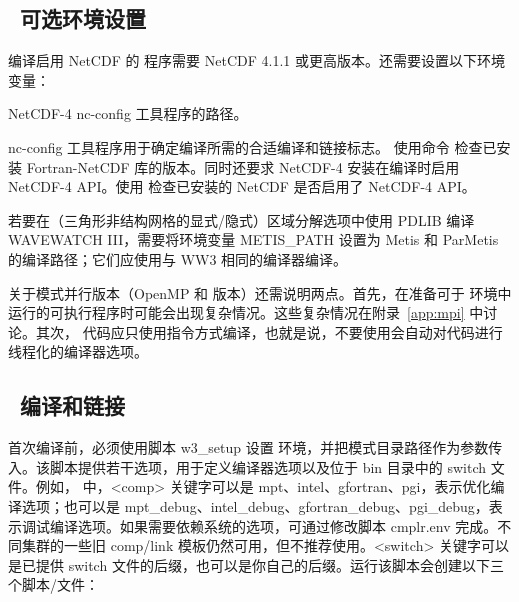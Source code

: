 \vssub
\subsection{~可选环境设置}
\vssub

编译启用 NetCDF 的 \ws{} 程序需要 NetCDF 4.1.1 或更高版本。还需要设置以下环境变量：
\begin{clist}
 {NetCDF-4 nc-config 工具程序的路径。}
\end{clist}
{\file nc-config} 工具程序用于确定编译所需的合适编译和链接标志。
使用命令
 检查已安装 Fortran-NetCDF 库的版本。同时还要求 NetCDF-4 安装在编译时启用 NetCDF-4 API。使用  检查已安装的 NetCDF 是否启用了 NetCDF-4 API。

\vspace{\baselineskip}
\noindent
若要在（三角形非结构网格的显式/隐式）区域分解选项中使用 PDLIB 编译 WAVEWATCH III，需要将环境变量 {\code METIS\_PATH} 设置为 {\code Metis} 和 {\code ParMetis} 的编译路径；它们应使用与 WW3 相同的编译器编译。

\vspace{\baselineskip}
\noindent
关于模式并行版本（OpenMP 和 \mpi{} 版本）还需说明两点。首先，在准备可于 \mpi{} 环境中运行的可执行程序时可能会出现复杂情况。这些复杂情况在附录~\ref{app:mpi} 中讨论。其次，\omp{} 代码应只使用指令方式编译，也就是说，不要使用会自动对代码进行线程化的编译器选项。



\vssub
\subsection{~编译和链接} \label{sec:comp}
\vssub

\vspace{\baselineskip} \noindent
首次编译前，必须使用脚本 {\file w3\_setup} 设置 \ws{} 环境，并把模式目录路径作为参数传入。该脚本提供若干选项，用于定义编译器选项以及位于 {\dir bin} 目录中的 switch 文件。例如， 中，{\code <comp>} 关键字可以是 {\code mpt}、{\code intel}、{\code gfortran}、{\code pgi}，表示优化编译选项；也可以是 {\code mpt\_debug}、{\code intel\_debug}、{\code gfortran\_debug}、{\code pgi\_debug}，表示调试编译选项。如果需要依赖系统的选项，可通过修改脚本 {\file cmplr.env} 完成。不同集群的一些旧 comp/link 模板仍然可用，但不推荐使用。{\code <switch>} 关键字可以是已提供 switch 文件的后缀，也可以是你自己的后缀。运行该脚本会创建以下三个脚本/文件：

